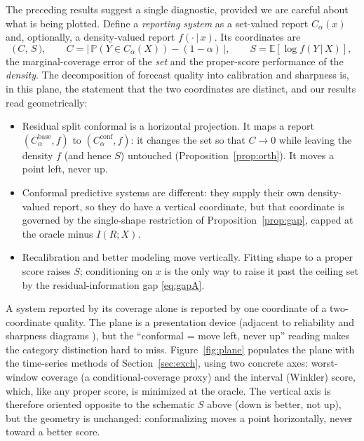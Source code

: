 \documentclass[10pt]{article} %
\theoremstyle{definition}
\newcommand{\E}{\mathbb{E}}
\renewcommand{\Pr}{\mathbb{P}}
\newcommand{\given}{\,\vert\,}
\begin{document}
The preceding results suggest a single diagnostic, provided we are careful about what is
being plotted. Define a \emph{reporting system} as a set-valued report $C_\alpha(x)$ and,
optionally, a density-valued report $f(\cdot\given x)$. Its coordinates are
\begin{equation}
  \big(\,C,\,S\,\big),\qquad
  C=\big|\,\Pr(Y\in C_\alpha(X))-(1-\alpha)\,\big|,\qquad
  S=\E[\log f(Y\given X)],
\end{equation}
the marginal-coverage error of the \emph{set} and the proper-score performance of the
\emph{density}. The decomposition of forecast quality into calibration and sharpness
\citep{gneiting2007probabilistic} is, in this plane, the statement that the two
coordinates are distinct, and our results read geometrically:
\begin{itemize}
  \item Residual split conformal is a horizontal projection. It maps a report
  $(C_\alpha^{\text{base}},f)$ to $(C_\alpha^{\text{conf}},f)$: it changes the set so that
  $C\to 0$ while leaving the density $f$ (and hence $S$) untouched
  (Proposition~\ref{prop:orth}). It moves a point left, never up.
  \item Conformal predictive systems are different: they supply their own
  density-valued report, so they do have a vertical coordinate, but that coordinate is
  governed by the single-shape restriction of Proposition~\ref{prop:gap}, capped at the
  oracle minus $I(R;X)$.
  \item Recalibration and better modeling move vertically. Fitting shape to a
  proper score raises $S$; conditioning on $x$ is the only way to raise it past the
  ceiling set by the residual-information gap \eqref{eq:gapA}.
\end{itemize}
A system reported by its coverage alone is reported by one coordinate of a
two-coordinate quality. The plane is a presentation device (adjacent to reliability
and sharpness diagrams \citep{gneiting2007probabilistic}), but the ``conformal = move
left, never up'' reading makes the category distinction hard to miss. Figure~\ref{fig:plane}
populates the plane with the time-series methods of Section~\ref{sec:exch}, using two
concrete axes: worst-window coverage (a conditional-coverage proxy) and the interval
(Winkler) score, which, like any proper score, is minimized at the oracle. The vertical axis
is therefore oriented opposite to the schematic $S$ above (down is better, not up), but the
geometry is unchanged: conformalizing moves a point horizontally, never toward a better
score.
\end{document}
